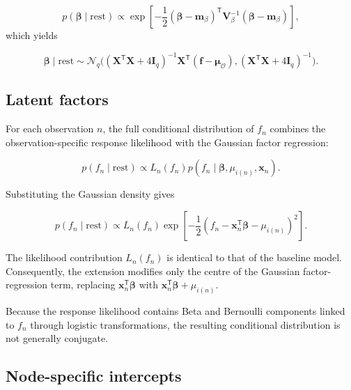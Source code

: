 \documentclass[pdftex,12pt,openright,a4paper,oneside]{book}
\begin{document}
\begin{equation*}
p(\boldsymbol{\beta}\mid\mathrm{rest})
\propto
\exp\left[
-\frac12
(\boldsymbol{\beta}-\mathbf{m}_{\beta})^{\mathsf T}
\mathbf{V}_{\beta}^{-1}
(\boldsymbol{\beta}-\mathbf{m}_{\beta})
\right],
\end{equation*}
which yields

\begin{equation*}
\boldsymbol{\beta}\mid\mathrm{rest}
\sim\mathcal{N}_q\Big(
(\mathbf{X}^{\mathsf T}\mathbf{X}
+4\mathbf{I}_q)^{-1}
\mathbf{X}^{\mathsf T}
(\mathbf{f}-\boldsymbol{\mu}_{\mathcal{O}}),
(\mathbf{X}^{\mathsf T}\mathbf{X}
+4\mathbf{I}_q)^{-1}
\Big).
\end{equation*}

\subsection{Latent factors}
\label{app:node_factor_conditional}

For each observation $n$, the full conditional
distribution of $f_n$ combines the observation-specific
response likelihood with the Gaussian factor regression:

\begin{equation*}
p(f_n\mid\mathrm{rest})
\propto
L_n(f_n)
p(f_n\mid
\boldsymbol{\beta},\mu_{i(n)},\mathbf{x}_n).
\end{equation*}

Substituting the Gaussian density gives

\begin{equation*}
p(f_n\mid\mathrm{rest})
\propto
L_n(f_n)
\exp\left[
-\frac12
\left(
f_n-\mathbf{x}_n^{\mathsf T}
\boldsymbol{\beta}-\mu_{i(n)}
\right)^2
\right].
\end{equation*}

The likelihood contribution $L_n(f_n)$
is identical to that of the baseline model.
Consequently, the extension modifies only
the centre of the Gaussian factor-regression
term, replacing
$\mathbf{x}_n^{\mathsf T}\boldsymbol{\beta}$
with
$\mathbf{x}_n^{\mathsf T}\boldsymbol{\beta}
+\mu_{i(n)}$.

Because the response likelihood contains
Beta and Bernoulli components linked to
$f_n$ through logistic transformations,
the resulting conditional distribution
is not generally conjugate.

\subsection{Node-specific intercepts}
\label{app:node_mu_conditional}
\end{document}
